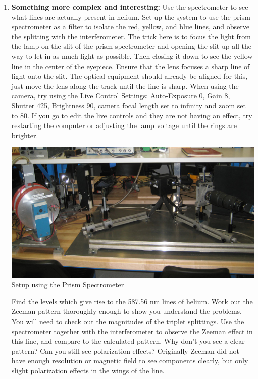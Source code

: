 \documentclass{../lab}
\begin{document}
\begin{enumerate}
    \item \textbf{Something more complex and interesting:} Use the spectrometer to see what lines are actually present in helium. Set up the system to use the prism spectrometer as a filter to isolate the red, yellow, and blue lines, and observe the splitting with the interferometer. The trick here is to focus the light from the lamp on the slit of the prism spectrometer and opening the slit up all the way to let in as much light as possible. Then closing it down to see the yellow line in the center of the eyepiece. Ensure that the lens focuses a sharp line of light onto the slit. The optical equipment should already be aligned for this, just move the lens along the track until the line is sharp. When using the camera, try using the Live Control Settings: Auto-Exposure 0, Gain 8, Shutter 425, Brightness 90, camera focal length set to infinity and zoom set to 80. If you go to edit the live controls and they are not having an effect, try restarting the computer or adjusting the lamp voltage until the rings are brighter.
    \begin{center}
        \href{http://experimentationlab.berkeley.edu/sites/default/files/images/ATM_Zeeman_3489-Crop-Lg.jpg}{\includegraphics[width=0.8\linewidth]{images/ATM_Zeeman_3489-Crop-Lg.jpg}} \\
        Setup using the Prism Spectrometer
    \end{center}
    
    Find the levels which give rise to the 587.56 nm lines of helium. Work out the Zeeman pattern thoroughly enough to show you understand the problems. You will need to check out the magnitudes of the triplet splittings. Use the spectrometer together with the interferometer to observe the Zeeman effect in this line, and compare to the calculated pattern. Why don't you see a clear pattern? Can you still see polarization effects? Originally Zeeman did not have enough resolution or magnetic field to see components clearly, but only slight polarization effects in the wings of the line.

\end{enumerate}
\end{document}
